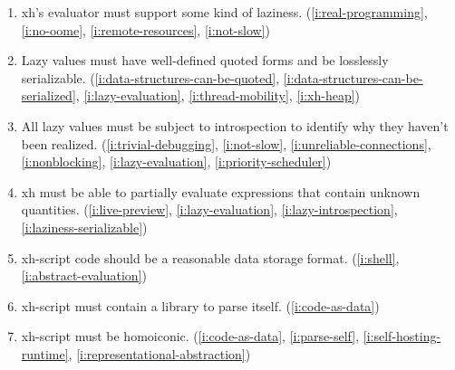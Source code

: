 \documentclass{report}
\begin{document}
\begin{enumerate}
\item{}\label{i:lazy-evaluation}
  xh's evaluator must support some kind of laziness.
    (\ref{i:real-programming},
     \ref{i:no-oome},
     \ref{i:remote-resources},
     \ref{i:not-slow})
\item{}\label{i:laziness-serializable}
  Lazy values must have well-defined quoted forms and be losslessly
  serializable.
    (\ref{i:data-structures-can-be-quoted},
     \ref{i:data-structures-can-be-serialized},
     \ref{i:lazy-evaluation},
     \ref{i:thread-mobility},
     \ref{i:xh-heap})
\item{}\label{i:lazy-introspection}
  All lazy values must be subject to introspection to identify why they
  haven't been realized.
    (\ref{i:trivial-debugging},
     \ref{i:not-slow},
     \ref{i:unreliable-connections},
     \ref{i:nonblocking},
     \ref{i:lazy-evaluation},
     \ref{i:priority-scheduler})
\item{}\label{i:abstract-evaluation}
  xh must be able to partially evaluate expressions that contain unknown
  quantities.
    (\ref{i:live-preview},
     \ref{i:lazy-evaluation},
     \ref{i:lazy-introspection},
     \ref{i:laziness-serializable})
\item{}\label{i:code-as-data}
  xh-script code should be a reasonable data storage format.
    (\ref{i:shell},
     \ref{i:abstract-evaluation})
\item{}\label{i:parse-self}
  xh-script must contain a library to parse itself.
    (\ref{i:code-as-data})
\item{}\label{i:homoiconic}
  xh-script must be homoiconic.
    (\ref{i:code-as-data},
     \ref{i:parse-self},
     \ref{i:self-hosting-runtime},
     \ref{i:representational-abstraction})


\end{enumerate}
\end{document}
